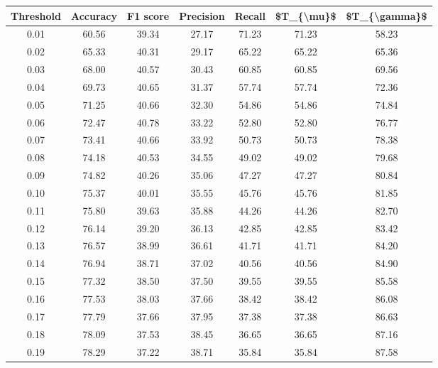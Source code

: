 \begin{tabular}{|c|c|c|c|c|c|c|}
\hline
 Threshold &  Accuracy &  F1 score &  Precision &  Recall &  \$T\_\{\textbackslash mu\}\$ &  \$T\_\{\textbackslash gamma\}\$ \\
\hline
      0.01 &     60.56 &     39.34 &      27.17 &   71.23 &      71.23 &         58.23 \\
      0.02 &     65.33 &     40.31 &      29.17 &   65.22 &      65.22 &         65.36 \\
      0.03 &     68.00 &     40.57 &      30.43 &   60.85 &      60.85 &         69.56 \\
      0.04 &     69.73 &     40.65 &      31.37 &   57.74 &      57.74 &         72.36 \\
      0.05 &     71.25 &     40.66 &      32.30 &   54.86 &      54.86 &         74.84 \\
      0.06 &     72.47 &     40.78 &      33.22 &   52.80 &      52.80 &         76.77 \\
      0.07 &     73.41 &     40.66 &      33.92 &   50.73 &      50.73 &         78.38 \\
      0.08 &     74.18 &     40.53 &      34.55 &   49.02 &      49.02 &         79.68 \\
      0.09 &     74.82 &     40.26 &      35.06 &   47.27 &      47.27 &         80.84 \\
      0.10 &     75.37 &     40.01 &      35.55 &   45.76 &      45.76 &         81.85 \\
      0.11 &     75.80 &     39.63 &      35.88 &   44.26 &      44.26 &         82.70 \\
      0.12 &     76.14 &     39.20 &      36.13 &   42.85 &      42.85 &         83.42 \\
      0.13 &     76.57 &     38.99 &      36.61 &   41.71 &      41.71 &         84.20 \\
      0.14 &     76.94 &     38.71 &      37.02 &   40.56 &      40.56 &         84.90 \\
      0.15 &     77.32 &     38.50 &      37.50 &   39.55 &      39.55 &         85.58 \\
      0.16 &     77.53 &     38.03 &      37.66 &   38.42 &      38.42 &         86.08 \\
      0.17 &     77.79 &     37.66 &      37.95 &   37.38 &      37.38 &         86.63 \\
      0.18 &     78.09 &     37.53 &      38.45 &   36.65 &      36.65 &         87.16 \\
      0.19 &     78.29 &     37.22 &      38.71 &   35.84 &      35.84 &         87.58 \\

\end{tabular}
